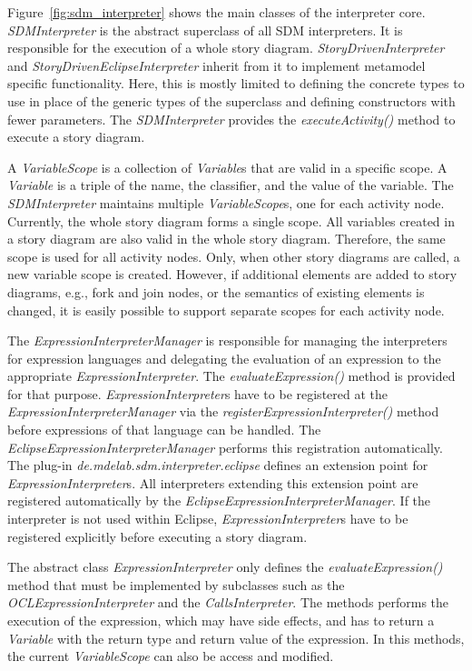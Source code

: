 Figure~\ref{fig:sdm_interpreter} shows the main classes of the interpreter core. 
\emph{SDMInterpreter} is the abstract superclass of all SDM interpreters. 
It is responsible for the execution of a whole story diagram. 
\emph{StoryDrivenInterpreter} and \emph{StoryDrivenEclipseInterpreter} inherit from it to implement metamodel specific functionality. 
Here, this is mostly limited to defining the concrete types to use in place of the generic types of the superclass and defining constructors with fewer parameters. 
The \emph{SDMInterpreter} provides the \emph{executeActivity()} method to execute a story diagram.

A \emph{VariableScope} is a collection of \emph{Variable}s that are valid in a specific scope.
A \emph{Variable} is a triple of the name, the classifier, and the value of the variable.
The \emph{SDMInterpreter} maintains multiple \emph{VariableScope}s, one for each activity node.
Currently, the whole story diagram forms a single scope.
All variables created in a story diagram are also valid in the whole story diagram. 
Therefore, the same scope is used for all activity nodes.
Only, when other story diagrams are called, a new variable scope is created. 
However, if additional elements are added to story diagrams, e.g., fork and join nodes, or the semantics of existing elements is changed, it is easily possible to support separate scopes for each activity node.

The \emph{ExpressionInterpreterManager} is responsible for managing the interpreters for expression languages and delegating the evaluation of an expression to the appropriate \emph{ExpressionInterpreter}. 
The \emph{evaluateExpression()} method is provided for that purpose. 
\emph{ExpressionInterpreter}s have to be registered at the \emph{ExpressionInterpreterManager} via the \emph{registerExpressionInterpreter()} method before expressions of that language can be handled. 
The \emph{EclipseExpressionInterpreterManager} performs this registration automatically. 
The plug-in \emph{de.mdelab.sdm.interpreter.eclipse} defines an extension point for \emph{ExpressionInterpreter}s. 
All interpreters extending this extension point are registered automatically by the \emph{EclipseExpressionInterpreterManager}. 
If the interpreter is not used within Eclipse, \emph{ExpressionInterpreter}s have to be registered explicitly before executing a story diagram.

The abstract class \emph{ExpressionInterpreter} only defines the \emph{evaluateExpression()} method that must be implemented by subclasses such as the \emph{OCLExpressionInterpreter} and the \emph{CallsInterpreter}. The methods performs the execution of the expression, which may have side effects, and has to return a \emph{Variable} with the return type and return value of the expression. In this methods, the current \emph{VariableScope} can also be access and modified.

